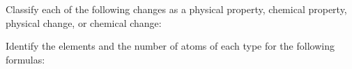 \documentclass[addpoints, 12pt]{exam}
\begin{document}
\begin{questions}

\question[8]
Classify each of the following changes as a physical property,
chemical property, physical change, or chemical change:


\question[8] Identify the elements and the number of atoms of each type for
  the following formulas:



\end{questions}
\end{document}
